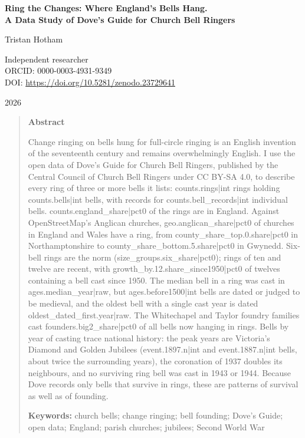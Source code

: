 \documentclass[11pt,a4paper]{article}
\begin{document}
\begin{center}
{\Large\bfseries Ring the Changes: Where England's Bells Hang.\\[2pt] A Data Study of Dove's Guide for Church Bell Ringers\par}
\vspace{1.2em}
{\large Tristan Hotham\par}
\vspace{0.3em}
{\small Independent researcher\\
ORCID: 0000-0003-4931-9349\\
DOI: \href{https://doi.org/10.5281/zenodo.23729641}{https://doi.org/10.5281/zenodo.23729641}\par}
\vspace{0.8em}
2026
\end{center}

\begin{quote}
\small
\begin{center}\textbf{Abstract}\end{center}
Change ringing on bells hung for full-circle ringing is an English invention of the seventeenth century and remains overwhelmingly English. I use the open data of Dove's Guide for Church Bell Ringers, published by the Central Council of Church Bell Ringers under CC BY-SA 4.0, to describe every ring of three or more bells it lists: {{counts.rings|int}} rings holding {{counts.bells|int}} bells, with records for {{counts.bell_records|int}} individual bells. {{counts.england_share|pct0}} of the rings are in England. Against OpenStreetMap's Anglican churches, {{geo.anglican_share|pct0}} of churches in England and Wales have a ring, from {{county_share_top.0.share|pct0}} in Northamptonshire to {{county_share_bottom.5.share|pct0}} in Gwynedd. Six-bell rings are the norm ({{size_groups.six_share|pct0}}); rings of ten and twelve are recent, with {{growth_by.12.share_since1950|pct0}} of twelves containing a bell cast since 1950. The median bell in a ring was cast in {{ages.median_year|raw}}, but {{ages.before1500|int}} bells are dated or judged to be medieval, and the oldest bell with a single cast year is dated {{oldest_dated_first.year|raw}}. The Whitechapel and Taylor foundry families cast {{founders.big2_share|pct0}} of all bells now hanging in rings. Bells by year of casting trace national history: the peak years are Victoria's Diamond and Golden Jubilees ({{event.1897.n|int}} and {{event.1887.n|int}} bells, about twice the surrounding years), the coronation of 1937 doubles its neighbours, and no surviving ring bell was cast in 1943 or 1944. Because Dove records only bells that survive in rings, these are patterns of survival as well as of founding.

\textbf{Keywords:} church bells; change ringing; bell founding; Dove's Guide; open data; England; parish churches; jubilees; Second World War
\end{quote}
\end{document}
